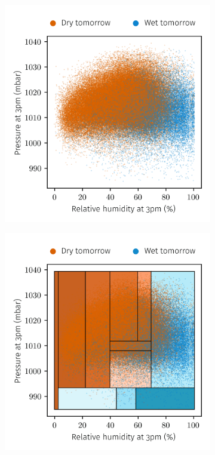 \begin{figure}
  \centering
  \begin{subfigure}{0.49\textwidth}
    \centering
    \includegraphics[scale=0.6]{graphics/weather_data.png}%
  \end{subfigure}
  \begin{subfigure}{0.49\textwidth}
    \centering
    \includegraphics[scale=0.6]{graphics/weather_data_filled_partition.png}%
  \end{subfigure}
\end{figure}

